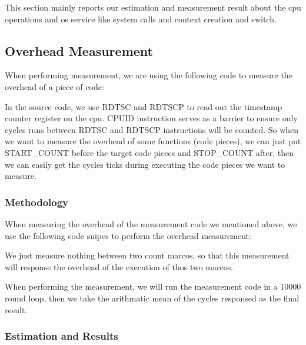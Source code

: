 
This section mainly reports our estimation and measurement result about the cpu operations and os service like system calls and context creation and switch.


\subsection{Overhead Measurement}
When performing measurement, we are using the following code to measure the overhead of a piece of code:



In the source code, we use RDTSC and RDTSCP to read out the timestamp counter register on the cpu. CPUID instruction serves as a barrier to ensure only cycles
runs between RDTSC and RDTSCP instructions will be counted. So when we want to measure the overhead of some functions (code pieces), we can just put START\_COUNT
before the target code pieces and STOP\_COUNT after, then we can easily get the cycles ticks during executing the code pieces we want to measure.


\subsubsection{Methodology}
When measuring the overhead of the measurement code we mentioned above, we use the following code snipes to perform the overhead measurement:



We just measure nothing between two count marcos, so that this measurement will response the overhead of the execution of thos two marcos.

When performing the measurement, we will run the measurement code in a 10000 round loop, then we take the arithmatic mean of the cycles responsed as the final result.


\subsubsection{Estimation and Results}
\label{overhead_estimation}

